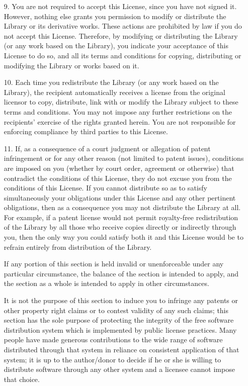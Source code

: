 \begin{multicols}{3}
\begin{itemize}
       \item[9.] You are not required to accept this License, since
         you have not signed it. However, nothing else grants you
         permission to modify or distribute the Library or its
         derivative works. These actions are prohibited by law if you
         do not accept this License. Therefore, by modifying or
         distributing the Library (or any work based on the Library),
         you indicate your acceptance of this License to do so, and
         all its terms and conditions for copying, distributing or
         modifying the Library or works based on it.
         
       \item[10.] Each time you redistribute the Library (or any work
         based on the Library), the recipient automatically receives a
         license from the original licensor to copy, distribute, link
         with or modify the Library subject to these terms and
         conditions. You may not impose any further restrictions on
         the recipients' exercise of the rights granted herein.  You
         are not responsible for enforcing compliance by third parties
         to this License.
         
       \item[11.] If, as a consequence of a court judgment or
         allegation of patent infringement or for any other reason
         (not limited to patent issues), conditions are imposed on you
         (whether by court order, agreement or otherwise) that
         contradict the conditions of this License, they do not excuse
         you from the conditions of this License. If you cannot
         distribute so as to satisfy simultaneously your obligations
         under this License and any other pertinent obligations, then
         as a consequence you may not distribute the Library at all.
         For example, if a patent license would not permit
         royalty-free redistribution of the Library by all those who
         receive copies directly or indirectly through you, then the
         only way you could satisfy both it and this License would be
         to refrain entirely from distribution of the Library.

    If any portion of this section is held invalid or unenforceable under
    any particular circumstance, the balance of the section is intended to
    apply, and the section as a whole is intended to apply in other
    circumstances.

    It is not the purpose of this section to induce you to infringe any
    patents or other property right claims or to contest validity of any
    such claims; this section has the sole purpose of protecting the
    integrity of the free software distribution system which is implemented
    by public license practices. Many people have made generous
    contributions to the wide range of software distributed through that
    system in reliance on consistent application of that system; it is up
    to the author/donor to decide if he or she is willing to distribute
    software through any other system and a licensee cannot impose that
    choice.


\end{itemize}
\end{multicols}
